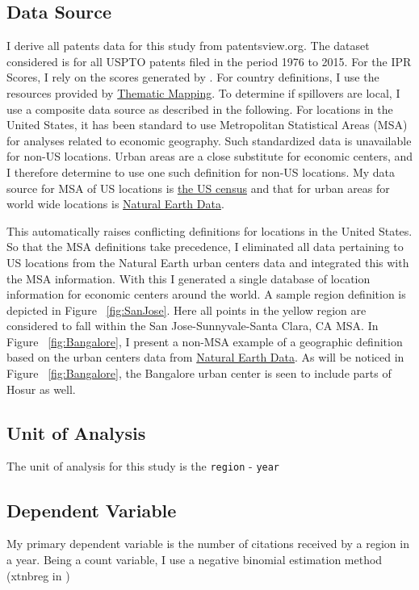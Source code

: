 \documentclass[12pt]{article}
\begin{document}
\subsection{Data Source}
I derive all patents data for this study from patentsview.org. The dataset considered is for all USPTO patents filed in the period 1976 to 2015. For the IPR Scores, I rely on the scores generated by \cite{Lesser2010}. For country definitions, I use the resources provided by \href{http://thematicmapping.org/downloads/world_borders.php}{Thematic Mapping}. To determine if spillovers are local, I use a composite data source as described in the following. For locations in the United States, it has been standard to use Metropolitan Statistical Areas (MSA) for analyses related to economic geography. Such standardized data is unavailable for non-US locations. Urban areas are a close substitute for  economic centers, and I therefore determine to use one such definition for non-US locations. My data source for MSA of US locations is \href{http://www.census.gov/geo/maps-data/data/cbf/cbf_msa.html}{the US census} and that for urban areas for world wide locations is \href{http://www.naturalearthdata.com/downloads/10m-cultural-vectors/}{Natural Earth Data}.
 
This automatically raises conflicting definitions for locations in the United States. So that the MSA definitions take precedence, I eliminated all data pertaining to US locations from the Natural Earth urban centers data and integrated this with the MSA information. With this I  generated a single database of location information for economic centers around the world. A sample region definition is depicted in Figure ~\ref{fig:SanJose}. Here all points in the yellow region are considered to fall within the San Jose-Sunnyvale-Santa Clara, CA MSA. In Figure ~\ref{fig:Bangalore}, I present a non-MSA example of a geographic definition based on the urban centers data from \href{http://www.naturalearthdata.com/downloads/10m-cultural-vectors/}{Natural Earth Data}. As will be noticed in Figure ~\ref{fig:Bangalore}, the Bangalore urban center is seen to include parts of Hosur as well.

\subsection{Unit of Analysis}
The unit of analysis for this study is the \verb|region| - \verb|year|

\subsection{Dependent Variable}
My primary dependent variable is the number of citations received by a region in a year. Being a count variable, I use a negative binomial estimation method (xtnbreg in \Stata)\\\\
\end{document}
